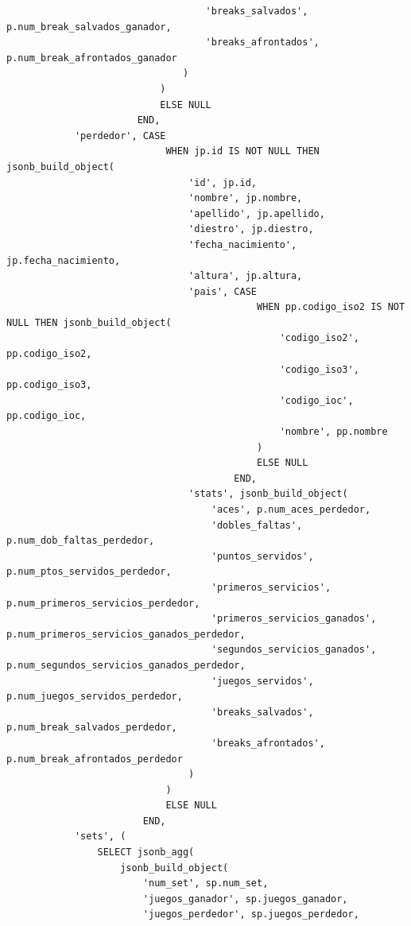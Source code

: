 \begin{verbatim}
                                   'breaks_salvados', p.num_break_salvados_ganador,
                                   'breaks_afrontados', p.num_break_afrontados_ganador
                               )
                           )
                           ELSE NULL 
                       END,
            'perdedor', CASE 
                            WHEN jp.id IS NOT NULL THEN jsonb_build_object(
                                'id', jp.id,
                                'nombre', jp.nombre,
                                'apellido', jp.apellido,
                                'diestro', jp.diestro,
                                'fecha_nacimiento', jp.fecha_nacimiento,
                                'altura', jp.altura,
                                'pais', CASE 
                                            WHEN pp.codigo_iso2 IS NOT NULL THEN jsonb_build_object(
                                                'codigo_iso2', pp.codigo_iso2,
                                                'codigo_iso3', pp.codigo_iso3,
                                                'codigo_ioc', pp.codigo_ioc,
                                                'nombre', pp.nombre
                                            )
                                            ELSE NULL 
                                        END,
                                'stats', jsonb_build_object(
                                    'aces', p.num_aces_perdedor,
                                    'dobles_faltas', p.num_dob_faltas_perdedor,
                                    'puntos_servidos', p.num_ptos_servidos_perdedor,
                                    'primeros_servicios', p.num_primeros_servicios_perdedor,
                                    'primeros_servicios_ganados', p.num_primeros_servicios_ganados_perdedor,
                                    'segundos_servicios_ganados', p.num_segundos_servicios_ganados_perdedor,
                                    'juegos_servidos', p.num_juegos_servidos_perdedor,
                                    'breaks_salvados', p.num_break_salvados_perdedor,
                                    'breaks_afrontados', p.num_break_afrontados_perdedor
                                )
                            )
                            ELSE NULL 
                        END,
            'sets', (
                SELECT jsonb_agg(
                    jsonb_build_object(
                        'num_set', sp.num_set,
                        'juegos_ganador', sp.juegos_ganador,
                        'juegos_perdedor', sp.juegos_perdedor,

\end{verbatim}
